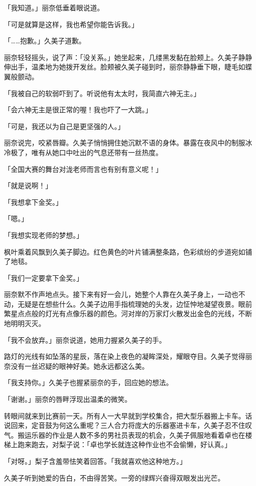 \documentclass[UTF8]{ctexart}
\begin{document}
    「我知道。」丽奈低垂着眼说道。 

    「可是就算是这样，我也希望你能告诉我。」 

    「……抱歉。」久美子道歉。 

    丽奈轻轻摇头，说了声：「没关系。」她坐起来，几缕黑发黏在脸颊上。久美子静静伸出手，温柔地为她拨开发丝。脸颊被久美子碰到时，丽奈静静垂下眼，睫毛如蝶翼般颤动。 

    「我被自己的软弱吓到了。听说他有太太时，我简直六神无主。」 

    「会六神无主是很正常的喔！我也吓了一大跳。」 

    「可是，我还以为自己是更坚强的人。」 

    丽奈说完，咬紧唇瓣。久美子悄悄拥住她沉默不语的身体。暴露在夜风中的制服冰冷极了，唯有从她口中吐出的气息还带有一丝热度。 

    「全国大赛的舞台对泷老师而言也有别有意义呢！」 

    「就是说啊！」 

    「我想拿下金奖。」 

    「嗯。」 

    「我想实现老师的梦想。」 

    枫叶乘着风飘到久美子脚边。红色黄色的叶片铺满整条路，色彩缤纷的步道宛如铺了地毯。 

    「我们一定要拿下金奖。」 

    丽奈默不作声地点头。接下来有好一会儿，她整个人靠在久美子身上，一动也不动，无疑是在想些什么。久美子边用手指梳理她的头发，边怔忡地凝望夜景。眼前繁星点点般的灯光有点像乐器的颜色。河对岸的万家灯火散发出金色的光线，不断地明明灭灭。 

    「我不会放弃。」丽奈说道，她用力握紧久美子的手。 

    路灯的光线有如坠落的星辰，落在染上夜色的凝眸深处，耀眼夺目。久美子觉得丽奈没有一丝迟疑的眼神好美。她永远都这么美。 

    「我支持你。」久美子也握紧丽奈的手，回应她的想法。 

    「谢谢。」丽奈的唇畔浮现出温柔的微笑。 

    转眼间就来到比赛前一天。所有人一大早就到学校集合，把大型乐器搬上卡车。话说回来，定音鼓为何这么重呢？三人合力将庞大的乐器塞进卡车，久美子忍不住叹气。搬运乐器的作业是人数不多的男社员表现的机会，久美子佩服地看着卓也在楼梯上跑来跑去，对梨子说：「卓也学长就连这种作业也不会偷懒，好认真。」 

    「对呀。」梨子含羞带怯笑着回答。「我就喜欢他这种地方。」 

    久美子听到她爱的告白，不由得苦笑。一旁的绿辉兴奋得双眼发出光芒。 
\end{document}
